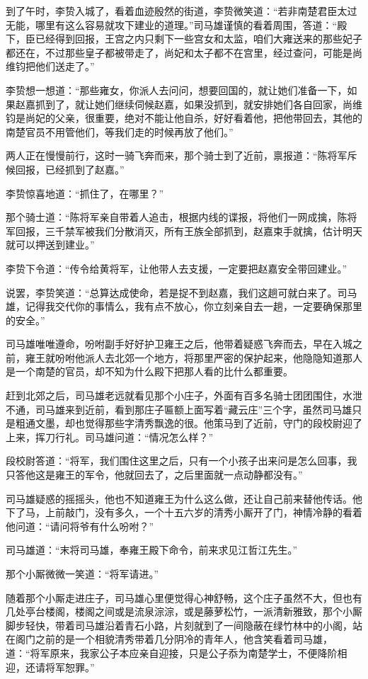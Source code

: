 到了午时，李贽入城了，看着血迹殷然的街道，李贽微笑道：“若非南楚君臣太过无能，哪里有这么容易就攻下建业的道理。”司马雄谨慎的看着周围，答道：“殿下，臣已经得到回报，王宫之内只剩下一些宫女和太监，咱们大雍送来的那些妃子都还在，不过那些皇子都被带走了，尚妃和太子都不在宫里，经过查问，可能是尚维钧把他们送走了。”

李贽想一想道：“那些雍女，你派人去问问，想要回国的，就让她们准备一下，如果赵嘉抓到了，就让她们继续伺候赵嘉，如果没抓到，就安排她们各自回家，尚维钧是尚妃的父亲，很重要，绝对不能让他自杀，好好看着他，把他带回去，其他的南楚官员不用管他们，等我们走的时候再放了他们。”

两人正在慢慢前行，这时一骑飞奔而来，那个骑士到了近前，禀报道：“陈将军斥候回报，已经抓到了赵嘉。”

李贽惊喜地道：“抓住了，在哪里？”

那个骑士道：“陈将军亲自带着人追击，根据内线的谍报，将他们一网成擒，陈将军回报，三千禁军被我们分散消灭，所有王族全部抓到，赵嘉束手就擒，估计明天就可以押送到建业。”

李贽下令道：“传令给黄将军，让他带人去支援，一定要把赵嘉安全带回建业。”

说罢，李贽笑道：“总算达成使命，若是捉不到赵嘉，我们这趟可就白来了。司马雄，记得我交代你的事情么，我有点不放心，你立刻亲自去一趟，一定要确保那里的安全。”

司马雄唯唯遵命，吩咐副手好好护卫雍王之后，他带着疑惑飞奔而去，早在入城之前，雍王就吩咐他派人去北郊一个地方，将那里严密的保护起来，他隐隐知道那人是一个南楚的官员，却不知为什么殿下把那人看的比什么都重要。

赶到北郊之后，司马雄老远就看见那个小庄子，外面有百多名骑士团团围住，水泄不通，司马雄来到近前，看到那庄子匾额上面写着“藏云庄”三个字，虽然司马雄只是粗通文墨，却也觉得那些字清秀飘逸的很。他策马到了近前，守门的段校尉迎了上来，挥刀行礼。司马雄问道：“情况怎么样？”

段校尉答道：“将军，我们围住这里之后，只有一个小孩子出来问是怎么回事，我只答他这是雍王的军令，他就回去了，之后里面就一点动静都没有。”

司马雄疑惑的摇摇头，他也不知道雍王为什么这么做，还让自己前来替他传话。他下了马，上前敲门，没有多久，一个十五六岁的清秀小厮开了门，神情冷静的看着他问道：“请问将爷有什么吩咐？”

司马雄道：“末将司马雄，奉雍王殿下命令，前来求见江哲江先生。”

那个小厮微微一笑道：“将军请进。”

随着那个小厮走进庄子，司马雄心里便觉得心神舒畅，这个庄子虽然不大，但也有几处亭台楼阁，楼阁之间或是流泉淙淙，或是藤萝松竹，一派清新雅致，那个小厮脚步轻快，带着司马雄沿着青石小路，片刻就到了一间隐蔽在绿竹林中的小阁，站在阁门之前的是一个相貌清秀带着几分阴冷的青年人，他含笑看着司马雄，道：“将军原来，我家公子本应亲自迎接，只是公子忝为南楚学士，不便降阶相迎，还请将军恕罪。”

